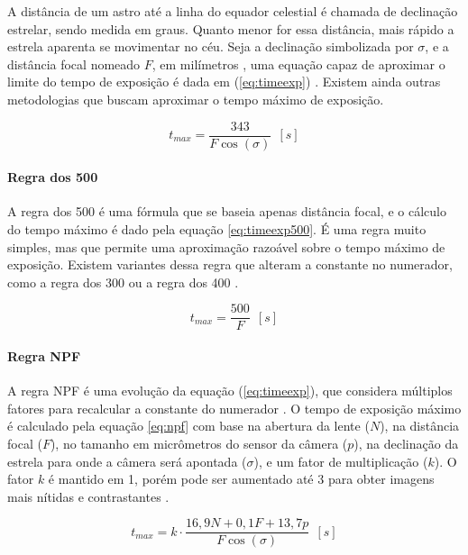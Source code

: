 A distância de um astro até a linha do equador celestial é chamada de declinação estrelar, sendo medida em graus. Quanto menor for essa distância, mais rápido a estrela aparenta se movimentar no céu. Seja a declinação simbolizada por $\sigma$, e a distância focal nomeado $F$, em milímetros , uma equação capaz de aproximar o limite do tempo de exposição é dada em (\ref{eq:timeexp}) \cite{book:astrophotographyAmateur}. Existem ainda outras metodologias que buscam aproximar o tempo máximo de exposição. 

\begin{equation}
	t_{max} = \dfrac{343}{F\cos(\sigma)}~~[s]
	\label{eq:timeexp}
\end{equation}



\paragraph{Regra dos 500}

A regra dos 500 é uma fórmula que se baseia apenas distância focal, e o cálculo do tempo máximo é dado pela equação \ref{eq:timeexp500}. É uma regra muito simples, mas que permite uma aproximação razoável sobre o tempo máximo de exposição. Existem variantes dessa regra que alteram a constante no numerador, como a regra dos 300 ou a regra dos 400 \cite{site:500xNPF}.

\begin{equation}
	t_{max} = \dfrac{500}{F}~~[s]
	\label{eq:timeexp500}
\end{equation}

\paragraph{Regra NPF}

A regra NPF é uma evolução da equação (\ref{eq:timeexp}), que considera múltiplos fatores para recalcular a constante do numerador
\cite{site:500xNPF}. O tempo de exposição máximo é calculado pela equação \ref{eq:npf} com base na abertura da lente ($ N $), na distância focal ($ F $), no tamanho em micrômetros do sensor da câmera ($ p $), na declinação da estrela para onde a câmera será apontada ($\sigma$), e um fator de multiplicação ($ k $). O fator $ k $ é mantido em 1, porém pode ser aumentado até 3 para obter imagens mais nítidas e contrastantes \cite{site:500xNPF}. 

\begin{equation}
	t_{max} = k \cdot \dfrac{16,9 N  + 0,1 F + 13,7 p}{F\cos(\sigma)}~~[s]
	\label{eq:npf}
\end{equation}

